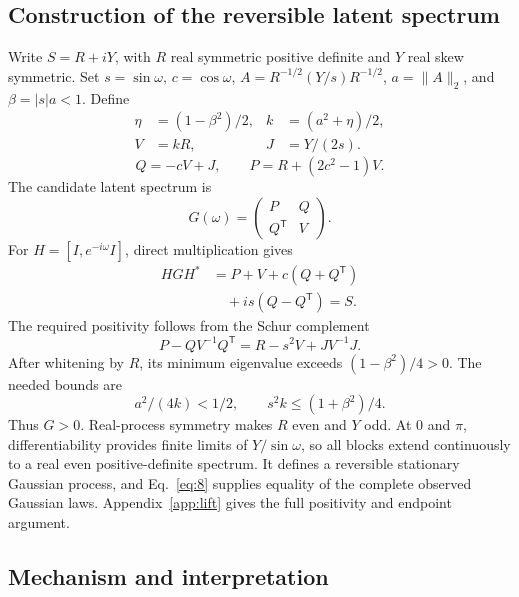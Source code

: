 \documentclass[aps,pre,reprint,amsmath,amssymb,superscriptaddress]{revtex4-2}
\begin{document}
\subsection{Construction of the reversible latent spectrum}
Write $S=R+iY$, with $R$ real symmetric positive definite and $Y$ real skew symmetric. Set $s=\sin\omega$, $c=\cos\omega$, $A=R^{-1/2}(Y/s)R^{-1/2}$, $a=\|A\|_2$, and $\beta=|s|a<1$. Define
\[
 \begin{aligned}\eta&=(1-\beta^2)/2, &k&=(a^2+\eta)/2,\\V&=kR, &J&=Y/(2s).\end{aligned}
\]
\[
 Q=-cV+J,\qquad P=R+(2c^2-1)V.
\]
The candidate latent spectrum is
\begin{equation}\label{eq:7}
 G(\omega)=\begin{pmatrix}P&Q\\Q^{\mathsf T}&V\end{pmatrix}.
\end{equation}
For $H=[I,e^{-i\omega}I]$, direct multiplication gives
\begin{equation}\label{eq:8}
 \begin{aligned}HGH^*&=P+V+c(Q+Q^{\mathsf T})\\&\quad+is(Q-Q^{\mathsf T})=S.\end{aligned}
\end{equation}
The required positivity follows from the Schur complement
\begin{equation}\label{eq:9}
 P-QV^{-1}Q^{\mathsf T}=R-s^2V+JV^{-1}J.
\end{equation}
After whitening by $R$, its minimum eigenvalue exceeds $(1-\beta^2)/4>0$. The needed bounds are
\[a^2/(4k)<1/2,\qquad s^2k\le(1+\beta^2)/4.\]
Thus $G>0$. Real-process symmetry makes $R$ even and $Y$ odd. At $0$ and $\pi$, differentiability provides finite limits of $Y/\sin\omega$, so all blocks extend continuously to a real even positive-definite spectrum. It defines a reversible stationary Gaussian process, and Eq.~\eqref{eq:8} supplies equality of the complete observed Gaussian laws. Appendix~\ref{app:lift} gives the full positivity and endpoint argument.

\subsection{Mechanism and interpretation}
\end{document}
